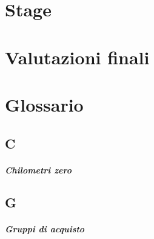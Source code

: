 \documentclass[11pt,a4paper,headsepline,hidelinks]{scrreprt} %
\begin{document}

	\chapter{Stage}




	\chapter{Valutazioni finali}

	\appendix
	\chapter[Glossario]{Glossario}
	\section*{C}
	\paragraph{Chilometri zero}
	\section*{G}
	\paragraph{Gruppi di acquisto}
\end{document}
